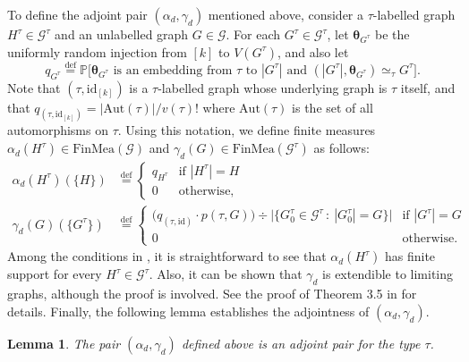 \documentclass{article}
\newtheorem{lem}[thm]{Lemma}
\newcommand*{\defeq}{\stackrel{\mathrm{def}}{=}}
\newcommand*{\FinMea}{\mathrm{FinMea}}
\begin{document}
To define the adjoint pair $(\alpha_d,\gamma_d)$ mentioned above, consider a $\tau$-labelled graph $H^\tau \in \mathcal{G}^\tau$ and an unlabelled graph $G \in \mathcal{G}$. For each $G^\tau \in \mathcal{G}^\tau$, let $\boldsymbol{\theta}_{G^\tau}$ be the uniformly random injection from $[k]$ to $V(G^\tau)$, and also let
\[
  q_{G^\tau} \defeq \mathbb{P}\Big[\boldsymbol{\theta}_{G^\tau} \text{ is an embedding from $\tau$ to $|G^\tau|$ and $(|G^\tau|,\boldsymbol{\theta}_{G^\tau}) \simeq_\tau G^\tau$}\Big].
\]
Note that $(\tau,\mathrm{id}_{[k]})$ is a $\tau$-labelled graph whose underlying graph is $\tau$ itself, 
and that $q_{(\tau,\mathrm{id}_{[k]})} = |\mathrm{Aut}(\tau)| / v(\tau)!$ where $\mathrm{Aut}(\tau)$ is the set of all automorphisms on $\tau$. Using this notation,
we define finite measures $\alpha_d(H^\tau) \in \FinMea(\mathcal{G})$ and $\gamma_d(G) \in \FinMea(\mathcal{G}^\tau)$ as follows:
\begin{align*}
  \alpha_d(H^\tau)(\{H\}) & \defeq 
  \begin{cases}
  q_{H^\tau} & \text{if } |H^\tau| = H
  \\
  0 & \text{otherwise},
  \end{cases}
  \\
  \gamma_d(G)(\{G^\tau\}) & \defeq 
  \begin{cases}
  \big(q_{(\tau,\mathrm{id})} \cdot p(\tau,G)\big) \div \big|\{G^\tau_0 \in \mathcal{G}^\tau \,:\ |G^\tau_0| = G\}\big| & \text{if } |G^\tau| = G
  \\
  0 & \text{otherwise}.
  \end{cases}
\end{align*}
Among the conditions in , it is straightforward to see that $\alpha_d(H^\tau)$ has finite support for every $H^\tau \in \mathcal{G}^\tau$. Also, it can be shown that $\gamma_d$ is extendible to limiting graphs, although the proof is involved. See the proof of Theorem 3.5 in \cite{Razborov2007} for details. Finally, the following lemma establishes the adjointness of $(\alpha_d,\gamma_d)$.
\begin{lem}
  \label{lemma:downward-adjoint}
  The pair $(\alpha_d,\gamma_d)$ defined above is an adjoint pair for the type $\tau$.
\end{lem}
\end{document}
